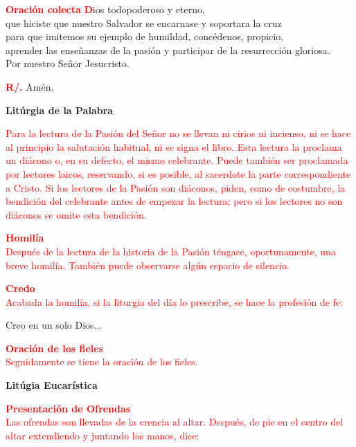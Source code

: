 \documentclass[12pt, letterpaper]{report}
\begin{document}
	\Large {\bfseries \textcolor{red}{Oraci\'on colecta}}
	\lettrine[lines=2]{\bfseries \textcolor{red}{D}}{}\Large {ios todopoderoso y eterno,\\
	que hiciste que nuestro Salvador se encarnase y soportara la cruz\\
	para que imitemos su ejemplo de humildad, concédenos, propicio,\\
	aprender las enseñanzas de la pasión y participar de la resurrección gloriosa.\\
	Por nuestro Señor Jesucristo.}

	\noindent
	\Large{{\bfseries \textcolor{red}{R/.}} \hspace{0.5cm} Amén.}

	\begin{center}
	\Huge {\bfseries Lit\'urgia de la Palabra}
	\end{center}

	\large {\textcolor{red}{Para la lectura de la Pasión del Señor no se llevan ni cirios ni incienso, ni se hace al principio la salutación habitual, ni se signa el libro. Esta lectura la proclama un diácono o, en su defecto, el mismo celebrante. Puede también ser proclamada por lectores laicos, reservando, si es posible, al sacerdote la parte correspondiente a Cristo. Si los lectores de la Pasión son diáconos, piden, como de costumbre, la bendición del celebrante antes de empezar la lectura; pero si los lectores no son diáconos se omite esta bendición.}}

	\Large {\bfseries \textcolor{red}{Homil\'ia}}\\
	\large {\textcolor{red}{Después de la lectura de la historia de la Pasión téngase, oportunamente, una breve homilía. También puede observarse algún espacio de silencio.}}

	\Large {\bfseries \textcolor{red}{Credo}}\\
	\large {\textcolor{red}{Acabada la homil\'ia, si la liturgia del d\'ia lo prescribe, se hace la profesi\'on de fe:}}

	\noindent
	\Large {Creo en un solo Dios...}

	\Large {\bfseries \textcolor{red}{Oraci\'on de los fieles}}\\
	\large {\textcolor{red}{Seguidamente se tiene la oraci\'on de los fieles.}}

	\begin{center}
		\Huge {\bfseries Lit\'ugia Eucar\'istica}
	\end{center}

	\Large {\bfseries \textcolor{red}{Presentación de Ofrendas}}\\
	\large {\textcolor{red}{Las ofrendas son llevadas de la crencia al altar. Despu\'es, de pie en el centro del altar extendiendo y juntando las manos, dice:}}
\end{document}

